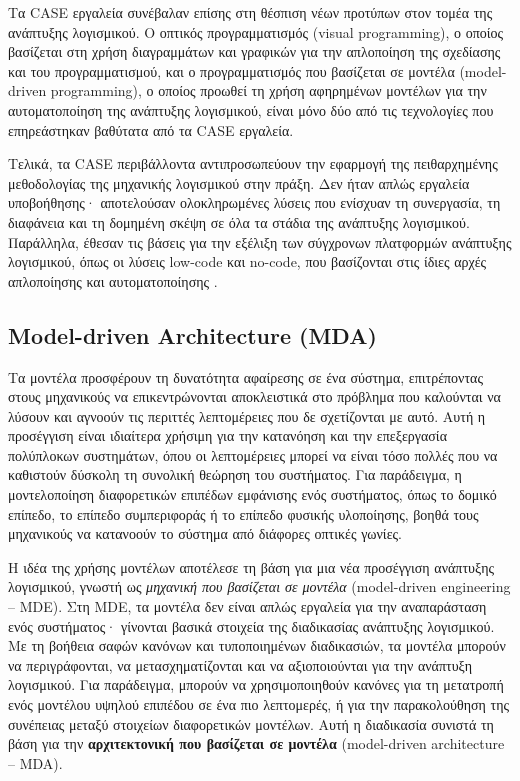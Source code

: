            Τα CASE εργαλεία συνέβαλαν επίσης στη θέσπιση νέων προτύπων στον τομέα της ανάπτυξης λογισμικού. Ο οπτικός προγραμματισμός (visual programming), ο οποίος βασίζεται στη χρήση διαγραμμάτων και γραφικών για την απλοποίηση της σχεδίασης και του προγραμματισμού, και ο προγραμματισμός που βασίζεται σε μοντέλα (model-driven programming), ο οποίος προωθεί τη χρήση αφηρημένων μοντέλων για την αυτοματοποίηση της ανάπτυξης λογισμικού, είναι μόνο δύο από τις τεχνολογίες που επηρεάστηκαν βαθύτατα από τα CASE εργαλεία.

            Τελικά, τα CASE περιβάλλοντα αντιπροσωπεύουν την εφαρμογή της πειθαρχημένης μεθοδολογίας της μηχανικής λογισμικού στην πράξη. Δεν ήταν απλώς εργαλεία υποβοήθησης· αποτελούσαν ολοκληρωμένες λύσεις που ενίσχυαν τη συνεργασία, τη διαφάνεια και τη δομημένη σκέψη σε όλα τα στάδια της ανάπτυξης λογισμικού. Παράλληλα, έθεσαν τις βάσεις για την εξέλιξη των σύγχρονων πλατφορμών ανάπτυξης λογισμικού, όπως οι λύσεις low-code και no-code, που βασίζονται στις ίδιες αρχές απλοποίησης και αυτοματοποίησης \cite{CASEChikofsky, Case1985, CASEKuhn, AdoptionCASE}.

        \subsection{Model-driven Architecture (MDA)}
            Τα μοντέλα προσφέρουν τη δυνατότητα αφαίρεσης σε ένα σύστημα, επιτρέποντας στους μηχανικούς να επικεντρώνονται αποκλειστικά στο πρόβλημα που καλούνται να λύσουν και αγνοούν τις περιττές λεπτομέρειες που δε σχετίζονται με αυτό. Αυτή η προσέγγιση είναι ιδιαίτερα χρήσιμη για την κατανόηση και την επεξεργασία πολύπλοκων συστημάτων, όπου οι λεπτομέρειες μπορεί να είναι τόσο πολλές που να καθιστούν δύσκολη τη συνολική θεώρηση του συστήματος. Για παράδειγμα, η μοντελοποίηση διαφορετικών επιπέδων εμφάνισης ενός συστήματος, όπως το δομικό επίπεδο, το επίπεδο συμπεριφοράς ή το επίπεδο φυσικής υλοποίησης, βοηθά τους μηχανικούς να κατανοούν το σύστημα από διάφορες οπτικές γωνίες.

            Η ιδέα της χρήσης μοντέλων αποτέλεσε τη βάση για μια νέα προσέγγιση ανάπτυξης λογισμικού, γνωστή ως \textit{μηχανική που βασίζεται σε μοντέλα} (model-driven engineering -- MDE). Στη MDE, τα μοντέλα δεν είναι απλώς εργαλεία για την αναπαράσταση ενός συστήματος· γίνονται βασικά στοιχεία της διαδικασίας ανάπτυξης λογισμικού. Με τη βοήθεια σαφών κανόνων και τυποποιημένων διαδικασιών, τα μοντέλα μπορούν να περιγράφονται, να μετασχηματίζονται και να αξιοποιούνται για την ανάπτυξη λογισμικού. Για παράδειγμα, μπορούν να χρησιμοποιηθούν κανόνες για τη μετατροπή ενός μοντέλου υψηλού επιπέδου σε ένα πιο λεπτομερές, ή για την παρακολούθηση της συνέπειας μεταξύ στοιχείων διαφορετικών μοντέλων. Αυτή η διαδικασία συνιστά τη βάση για την \textbf{αρχιτεκτονική που βασίζεται σε μοντέλα} (model-driven architecture -- MDA).


